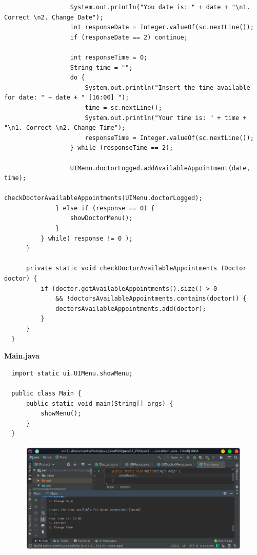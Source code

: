\documentclass{article}
\begin{document}
\begin{verbatim}
                  System.out.println("You date is: " + date + "\n1. Correct \n2. Change Date");
                  int responseDate = Integer.valueOf(sc.nextLine());
                  if (responseDate == 2) continue;

                  int responseTime = 0;
                  String time = "";
                  do {
                      System.out.println("Insert the time available for date: " + date + " [16:00] ");
                      time = sc.nextLine();
                      System.out.println("Your time is: " + time + "\n1. Correct \n2. Change Time");
                      responseTime = Integer.valueOf(sc.nextLine());
                  } while (responseTime == 2);

                  UIMenu.doctorLogged.addAvailableAppointment(date, time);
                  checkDoctorAvailableAppointments(UIMenu.doctorLogged);
              } else if (response == 0) {
                  showDoctorMenu();
              }
          } while( response != 0 );
      }

      private static void checkDoctorAvailableAppointments (Doctor doctor) {
          if (doctor.getAvailableAppointments().size() > 0
              && !doctorsAvailableAppointments.contains(doctor)) {
              doctorsAvailableAppointments.add(doctor);
          }
      }
  }
\end{verbatim}

\textbf{Main.java}
\begin{verbatim}
  import static ui.UIMenu.showMenu;

  public class Main {
      public static void main(String[] args) {
          showMenu();
      }
  }
\end{verbatim}

\begin{figure}[h!]
  \centering
  \includegraphics[scale=0.5]{./Pictures/052_uidoctor_funcional.png}
\end{figure}
\end{document}
